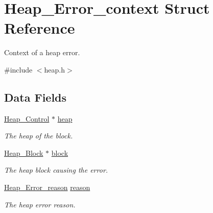 \hypertarget{structHeap__Error__context}{}\section{Heap\+\_\+\+Error\+\_\+context Struct Reference}
\label{structHeap__Error__context}


Context of a heap error.  




{\ttfamily \#include $<$heap.\+h$>$}

\subsection*{Data Fields}
\begin{DoxyCompactItemize}
\item 
\mbox{\label{structHeap__Error__context_ae7cfc4254963993c128ab07f08a2f596}} 
\mbox{\hyperlink{structHeap__Control}{Heap\+\_\+\+Control}} $\ast$ \mbox{\hyperlink{structHeap__Error__context_ae7cfc4254963993c128ab07f08a2f596}{heap}}
\begin{DoxyCompactList}\small\item\em The heap of the block. \end{DoxyCompactList}\item 
\mbox{\label{structHeap__Error__context_aa8efeaaed7f91e883ba28473820a6c5e}} 
\mbox{\hyperlink{structHeap__Block}{Heap\+\_\+\+Block}} $\ast$ \mbox{\hyperlink{structHeap__Error__context_aa8efeaaed7f91e883ba28473820a6c5e}{block}}
\begin{DoxyCompactList}\small\item\em The heap block causing the error. \end{DoxyCompactList}\item 
\mbox{\label{structHeap__Error__context_a93440bd9df1906c56e644c04f5c79106}} 
\mbox{\hyperlink{group__RTEMSScoreHeap_ga9f62692d135584572333cc6d1759e5e4}{Heap\+\_\+\+Error\+\_\+reason}} \mbox{\hyperlink{structHeap__Error__context_a93440bd9df1906c56e644c04f5c79106}{reason}}
\begin{DoxyCompactList}\small\item\em The heap error reason. \end{DoxyCompactList}\end{DoxyCompactItemize}


